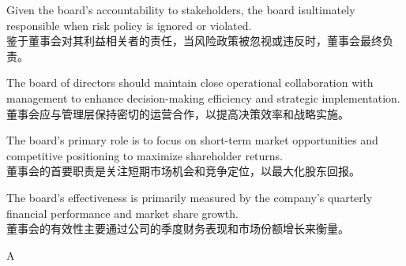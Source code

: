 \documentclass{article}
\begin{document}
\begin{choices}
    \item Given the board's accountability to stakeholders, the board isultimately responsible when risk policy is ignored or violated.\\
    鉴于董事会对其利益相关者的责任，当风险政策被忽视或违反时，董事会最终负责。

    \item The board of directors should maintain close operational collaboration with management to enhance decision-making efficiency and strategic implementation.\\
    董事会应与管理层保持密切的运营合作，以提高决策效率和战略实施。
    
    \item The board's primary role is to focus on short-term market opportunities and competitive positioning to maximize shareholder returns.\\
    董事会的首要职责是关注短期市场机会和竞争定位，以最大化股东回报。
    
    \item The board's effectiveness is primarily measured by the company's quarterly financial performance and market share growth.\\
    董事会的有效性主要通过公司的季度财务表现和市场份额增长来衡量。
\end{choices}

\begin{correctanswer}
    A
\end{correctanswer}
\end{document}
